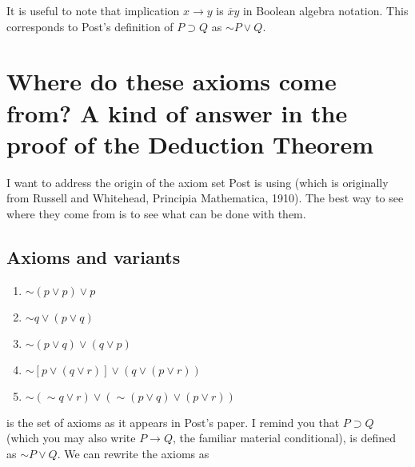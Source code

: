 \documentclass[12pt]{article}
\begin{document}
It is useful to note that implication $x \rightarrow y$ is $\overline xy$ in Boolean algebra notation.  This corresponds to Post's definition of $P \supset Q$ as
$\sim P \vee Q$.

\section{Where do these axioms come from?  A kind of answer in the proof of the Deduction Theorem}

I want to address the origin of the axiom set Post is using (which is originally from Russell and Whitehead, Principia Mathematica, 1910).  The best way to see where they come from is to see what can be done with them.

\subsection{Axioms and variants}

\begin{enumerate}

\item $\sim(p \vee p) \vee p$

\item $\sim q \vee (p \vee q)$

\item $\sim(p \vee q) \vee (q \vee p)$

\item $\sim[p \vee (q \vee r)] \vee (q \vee (p \vee r))$

\item $\sim(\sim q \vee r) \vee (\sim (p \vee q) \vee (p \vee r))$

\end{enumerate}

is the set of axioms as it appears in Post's paper.  I remind you that $P \supset Q$ (which you may also write $P \rightarrow Q$, the familiar material conditional), is
defined as $\sim P \vee Q$.  We can rewrite the axioms as
\end{document}
